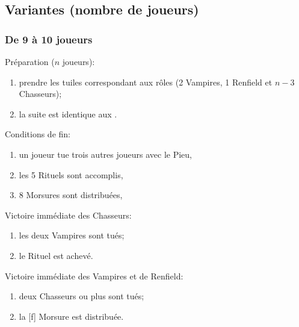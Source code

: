 \documentclass[11pt]{beamer}
\begin{document}
	\subsection{Variantes (nombre de joueurs)}

\begin{frame}
	\frametitle{De 9 à 10 joueurs}
	
	Préparation ($n$ joueurs):
	\begin{enumerate}
		\item prendre les tuiles correspondant aux rôles (2 Vampires, 1 Renfield et $n-3$ Chasseurs);
		\item la suite est identique aux \hyperlink{frame:start}{}.
	\end{enumerate}

	\vspace*{1ex}

	Conditions de fin:
	\begin{enumerate}
		\item un joueur tue trois autres joueurs avec le Pieu,
		\item les 5 Rituels sont accomplis,
		\item 8 Morsures sont distribuées,
	\end{enumerate}

	Victoire immédiate des Chasseurs:
	\begin{enumerate}
		\item les deux Vampires sont tués;
		\item le  Rituel est achevé.
	\end{enumerate}
	
	Victoire immédiate des Vampires et de Renfield:
	\begin{enumerate}
		\item deux Chasseurs ou plus sont tués;
		\item la [f] Morsure est distribuée.
	\end{enumerate}
\end{frame}
\end{document}

